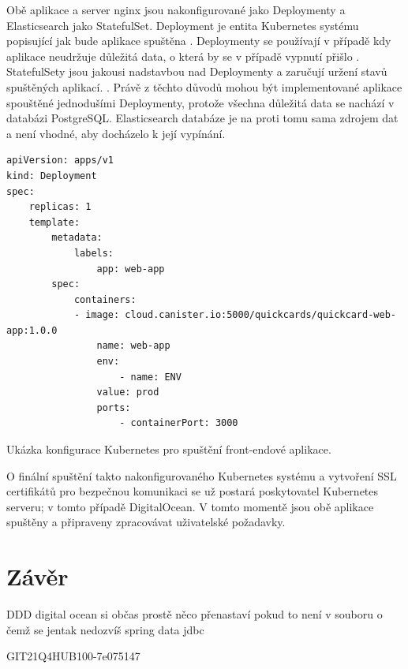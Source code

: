		Obě aplikace a server nginx jsou nakonfigurované jako Deploymenty a Elasticsearch jako StatefulSet.
		Deployment je entita Kubernetes systému popisující jak bude aplikace spuštěna \cite{deployements}.
		Deploymenty se používají v případě kdy aplikace neudržuje důležitá data, o která by se v případě vypnutí přišlo
		\cite{deployements}.
		StatefulSety jsou jakousi nadstavbou nad Deploymenty a zaručují uržení stavů spuštěných aplikací. \cite{statefulsets}.
		Právě z těchto důvodů mohou být implementované aplikace spouštěné jednodušími Deploymenty, protože všechna důležitá
		data se nachází v databázi PostgreSQL.
		Elasticsearch databáze je na proti tomu sama zdrojem dat a není vhodné, aby docházelo k její vypínání.

		\begin{lstlisting}
apiVersion: apps/v1
kind: Deployment
spec:
	replicas: 1
	template:
		metadata:
			labels:
				app: web-app
		spec:
			containers:
			- image: cloud.canister.io:5000/quickcards/quickcard-web-app:1.0.0
				name: web-app
				env:
					- name: ENV
				value: prod
				ports:
					- containerPort: 3000
		\end{lstlisting}
		Ukázka konfigurace Kubernetes pro spuštění front-endové aplikace. %

		O finální spuštění takto nakonfigurovaného Kubernetes systému a vytvoření SSL certifikátů pro bezpečnou komunikaci
		se už postará poskytovatel Kubernetes serveru; v tomto případě DigitalOcean.
		V tomto momentě jsou obě aplikace spuštěny a připraveny zpracovávat uživatelské požadavky.

\section{Závěr}

DDD
digital ocean si občas prostě něco přenastaví pokud to není v souboru o čemž se jentak nedozvíš
spring data jdbc

GIT21Q4HUB100-7e075147
